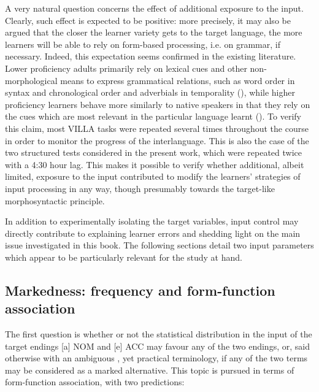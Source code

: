 A very natural question concerns the effect of additional exposure to the input. Clearly, such effect is expected to be positive: more precisely, it may also be argued that the closer the learner variety gets to the target language, the more learners will be able to rely on form-based processing, i.e. on grammar, if necessary. Indeed, this expectation seems confirmed in the existing literature. Lower proficiency adults primarily rely on lexical cues and other non-morphological means to express grammatical relations, such as word order in syntax and chronological order and adverbials in temporality (\citealt{Bardovi-Harlig2000, Lee2002, Leeser2004, EllisSagarra2010a}), while higher proficiency learners behave more similarly to native speakers in that they rely on the cues which are most relevant in the particular language learnt (\citealt{Giacalone-Ramat1992, Bardovi-Harlig1992b, SkibaDittmar1992, DietrichEtAl1995, Starren2001, Bardovi-Harlig2000, ParodiEtAl2006, BordagPechmann2007}). To verify this claim, most VILLA tasks were repeated several times throughout the course in order to monitor the progress of the interlanguage. This is also the case of the two structured tests considered in the present work, which were repeated twice with a 4:30 hour lag. This makes it possible to verify whether additional, albeit limited, exposure to the input contributed to modify the learners’ strategies of input processing in any way, though presumably towards the target-like morphosyntactic principle.

In addition to experimentally isolating the target variables, input control may directly contribute to explaining learner errors and shedding light on the main issue investigated in this book. The following sections detail two input parameters which appear to be particularly relevant for the study at hand. 

\subsection{Markedness: frequency and form-function association}\label{sec:01:4.1}

The first question is whether or not the statistical distribution in the input of the target endings [a] NOM and [e] ACC may favour any of the two endings, or, said otherwise with an ambiguous \citep{Haspelmath2006}, yet practical terminology, if any of the two terms may be considered as a marked alternative. This topic is pursued in terms of form-function association, with two predictions: 

